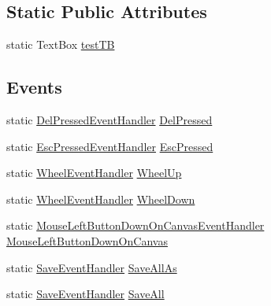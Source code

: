 \subsection*{Static Public Attributes}
\begin{DoxyCompactItemize}
\item 
static Text\+Box \mbox{\hyperlink{class_dimension___chain_1_1_main_window_ac9471cc1c0e1856c8d4602c21ca6fc1b}{test\+TB}}
\end{DoxyCompactItemize}
\subsection*{Events}
\begin{DoxyCompactItemize}
\item 
static \mbox{\hyperlink{class_dimension___chain_1_1_main_window_a34a91a946df99f170f8961d961a1fa8f}{Del\+Pressed\+Event\+Handler}} \mbox{\hyperlink{class_dimension___chain_1_1_main_window_add4063327d2d2bca0a70fa0040dc6ee5}{Del\+Pressed}}
\item 
static \mbox{\hyperlink{class_dimension___chain_1_1_main_window_acfa98ee5bdb96cc53214007d560dd087}{Esc\+Pressed\+Event\+Handler}} \mbox{\hyperlink{class_dimension___chain_1_1_main_window_a2587a8d2c35cf0e2722dd0704ca4c763}{Esc\+Pressed}}
\item 
static \mbox{\hyperlink{class_dimension___chain_1_1_main_window_ad49f6daca6cd98a445ca9d17d46b04ee}{Wheel\+Event\+Handler}} \mbox{\hyperlink{class_dimension___chain_1_1_main_window_a03c4a933fc8b36209bd22ef959ba87a2}{Wheel\+Up}}
\item 
static \mbox{\hyperlink{class_dimension___chain_1_1_main_window_ad49f6daca6cd98a445ca9d17d46b04ee}{Wheel\+Event\+Handler}} \mbox{\hyperlink{class_dimension___chain_1_1_main_window_a5b9d3178e029918e243295f9f7bdf21a}{Wheel\+Down}}
\item 
static \mbox{\hyperlink{class_dimension___chain_1_1_main_window_a8474fa1057f9cae2aa47066564dc69ee}{Mouse\+Left\+Button\+Down\+On\+Canvas\+Event\+Handler}} \mbox{\hyperlink{class_dimension___chain_1_1_main_window_a375f69d6d40a39909d9298824d7cf133}{Mouse\+Left\+Button\+Down\+On\+Canvas}}
\item 
static \mbox{\hyperlink{class_dimension___chain_1_1_main_window_a91ca9eba3ad3e48423c7a28f4fa5bcc2}{Save\+Event\+Handler}} \mbox{\hyperlink{class_dimension___chain_1_1_main_window_a631b06f923cbd0704faa23ba6abc381c}{Save\+All\+As}}
\item 
static \mbox{\hyperlink{class_dimension___chain_1_1_main_window_a91ca9eba3ad3e48423c7a28f4fa5bcc2}{Save\+Event\+Handler}} \mbox{\hyperlink{class_dimension___chain_1_1_main_window_a121618b4d573a4127931b905ff7bdee4}{Save\+All}}

\end{DoxyCompactItemize}

